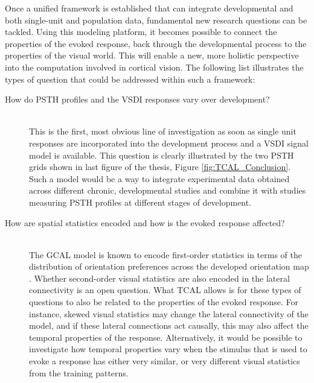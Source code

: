 \documentclass[phd,ianc,twoside]{infthesis}
\begin{document}
Once a unified framework is established that can integrate developmental
and both single-unit and population data, fundamental new research
questions can be tackled. Using this modeling platform, it becomes
possible to connect the properties of the evoked response, back through
the developmental process to the properties of the visual world. This
will enable a new, more holistic perspective into the computation
involved in cortical vision. The following list illustrates the types of
question that could be addressed within such a framework:

\begin{description}

\item[How do PSTH profiles and the VSDI responses vary over
  development?]\hfill \\ This is the first, most obvious line of
  investigation as soon as single unit responses are incorporated into the development
  process and a VSDI signal model is available. This question is clearly illustrated by the two PSTH grids shown in last figure of the thesis, Figure \ref{fig:TCAL_Conclusion}. Such a model would be
  a way to integrate experimental data obtained across different
  chronic, developmental studies and combine it with studies measuring
  PSTH profiles at different stages of development.

\item[How are spatial statistics encoded and how is the evoked response
  affected?] \hfill \\ The GCAL model is known to encode first-order
  statistics in terms of the distribution of orientation preferences
  across the developed orientation map \citep{stevens_jn13}.  Whether second-order visual
  statistics are also encoded in the lateral connectivity is an open
  question. What TCAL allows is for these types of questions to also be related
  to the properties of the evoked response. For instance, skewed visual
  statistics may change the lateral connectivity of the model, and if
  these lateral connections act causally, this may also affect the
  temporal properties of the response. Alternatively, it would be
  possible to investigate how temporal properties vary when the
  stimulus that is used to evoke a response has either very similar, or very
  different visual statistics from the training patterns.


\end{description}
\end{document}
